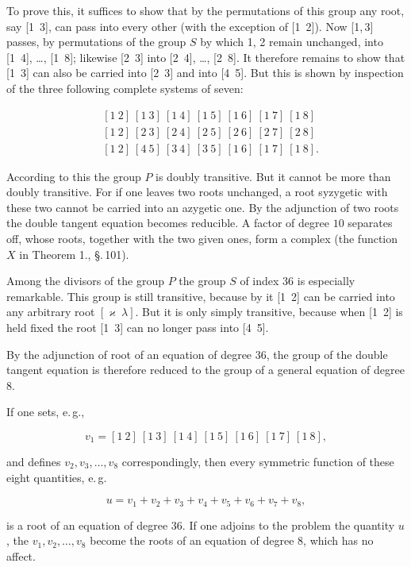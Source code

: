 
To prove this, it suffices to show that by the permutations
of this group any root, say [1\ 3], can pass into
every other (with the exception of [1\ 2]). Now
[1,\,3] %
passes, by permutations of the group $S$ by which
1, 2 remain unchanged, into [1\ 4], \dots, [1\ 8]; likewise [2\ 3] into
[2\ 4], \dots, [2\ 8]. It therefore remains to show that [1\ 3]
can also be carried into [2\ 3] and into [4\ 5]. But this is shown
by inspection of the three following complete systems of seven:

\[
\begin{aligned}
&[1\ 2]\ [1\ 3]\ [1\ 4]\ [1\ 5]\ [1\ 6]\ [1\ 7]\ [1\ 8]\\
&[1\ 2]\ [2\ 3]\ [2\ 4]\ [2\ 5]\ [2\ 6]\ [2\ 7]\ [2\ 8]\\
&[1\ 2]\ [4\ 5]\ [3\ 4]\ [3\ 5]\ [1\ 6]\ [1\ 7]\ [1\ 8].
\end{aligned}
\]

According to this the group $P$ is doubly transitive. But it
cannot be more than doubly transitive. For if one leaves
two roots unchanged, a root syzygetic with these two
cannot be carried into an azygetic one.
By the adjunction of two roots the double tangent equation
becomes reducible. A factor of degree $10$ separates off,
whose roots, together with the two given ones, form a 
complex (the function $X$ in Theorem 1., \S.\,101).

Among the divisors of the group $P$ the
group $S$ of index 36 is especially remarkable. This group is still
transitive, because by it [1\ 2] can be carried into any arbitrary root $[\varkappa\ \lambda]$.
But it is only simply transitive,
because when [1\ 2] is held fixed the root [1\ 3] can no longer
pass into [4\ 5].

By the adjunction of  root of an equation of degree $36$,
the group of the double tangent equation is therefore reduced to the
group of a general equation of degree $8$.

If one sets, e.\,g.,

\[
v_1 = [1\ 2]\ [1\ 3]\ [1\ 4]\ [1\ 5]\ [1\ 6]\ [1\ 7]\ [1\ 8],
\]

and defines $v_2, v_3, \dots, v_8$ correspondingly, then every symmetric
function of these eight quantities, e.\,g.

\[
u = v_1 + v_2 + v_3 + v_4 + v_5 + v_6 + v_7 + v_8,
\]

is a root of an equation of degree $36$. If one adjoins to the
problem the quantity $u$, the $v_1, v_2, \dots, v_8$ become the roots
of an equation of degree $8$, which has no affect.
